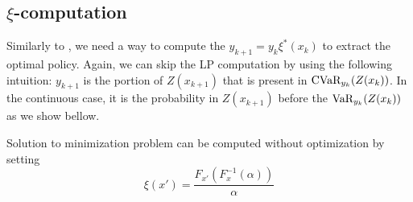 %
%
%
%

\subsection{$\xi$-computation}

Similarly to , we need a way to compute the $y_{k+1}=y_{k}\xi^*(x_k)$ to extract the optimal policy. Again, we can skip the LP computation by using the following intuition: $y_{k+1}$ is the portion of $Z(x_{k+1})$ that is present in $\text{CVaR}_{y_k}(Z(x_k))$. In the continuous case, it is the probability in $Z(x_{k+1})$ before the $\text{VaR}_{y_k}(Z(x_k))$ as we show bellow.


\begin{theorem}
Solution to minimization problem  can be computed without optimization by setting
\begin{equation}\label{eqn:xi-claim}
\xi ( x' ) = \dfrac{F_{x'}(F^{-1}_x(\alpha))}{\alpha} 
\end{equation}
\end{theorem}

